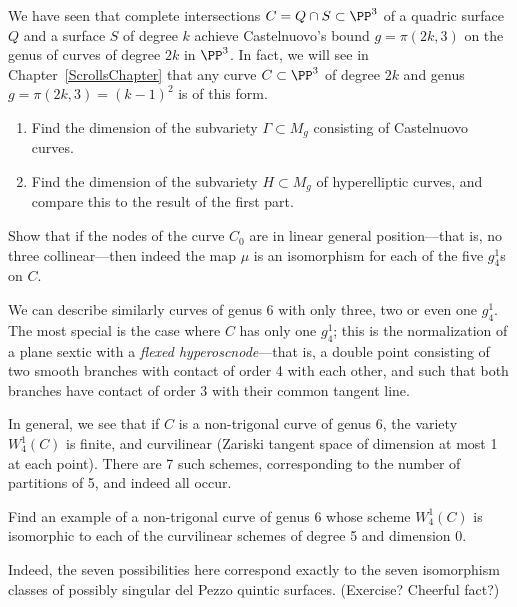 \begin{exercise}\label{rarity of Castelnuovo}
We have seen that complete intersections $C = Q \cap S \subset \PP^3$ of a quadric surface $Q$ and a surface $S$ of degree $k$ achieve Castelnuovo's bound $g = \pi(2k, 3)$ on the genus of curves of degree $2k$ in $\PP^3$. In fact, we will see in Chapter~\ref{ScrollsChapter} that any curve $C \subset \PP^3$ of degree $2k$ and genus $g = \pi(2k, 3) = (k-1)^2$ is of this form.
\begin{enumerate}
\item Find the dimension of the subvariety $\Gamma \subset M_g$ consisting of Castelnuovo curves.
\item Find the dimension of the subvariety $H \subset M_g$ of hyperelliptic curves, and compare this to the result of the first part.
\end{enumerate}
\end{exercise}


\begin{exercise}
Show that if the nodes of the curve $C_0$ are in linear general position---that is, no three collinear---then indeed the map $\mu$ is an isomorphism for each of the five $g^1_4$s on $C$.
\end{exercise}

We can describe similarly curves of genus 6 with only three, two or even one $g^1_4$. The most special is the case where $C$ has only one $g^1_4$; this is the normalization of a plane sextic with a \emph{flexed hyperoscnode}---that is, a double point consisting of two smooth branches with contact of order 4 with each other, and such that both branches have contact of order 3 with their common tangent line.

In general, we see that if $C$ is a non-trigonal curve of genus 6, the variety $W^1_4(C)$ is finite, and curvilinear (Zariski tangent space of dimension at most 1 at each point). There are 7 such schemes, corresponding to the number of partitions of 5, and indeed all occur.

\begin{exercise}
Find an example of a non-trigonal curve of genus 6 whose scheme $W^1_4(C)$ is isomorphic to each of the curvilinear schemes of degree 5 and dimension 0.
\end{exercise}

Indeed, the seven possibilities here correspond exactly to the seven isomorphism classes of possibly singular del Pezzo quintic surfaces. (Exercise? Cheerful fact?)




